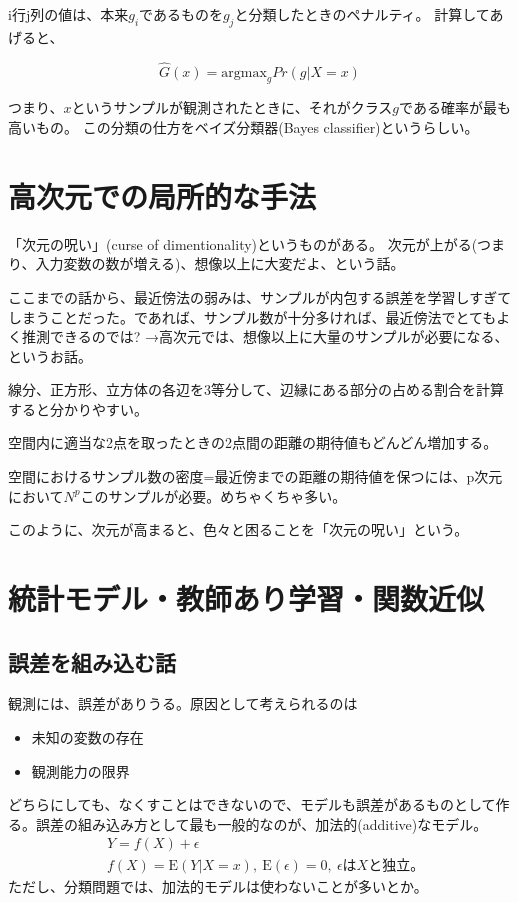 \documentclass[uplatex]{jsarticle}
\begin{document}
i行j列の値は、本来$g_i$であるものを$g_j$と分類したときのペナルティ。
計算してあげると、

\[
  \hat{G}(x) = \mathrm{argmax}_g Pr(g|X=x)
\]

つまり、$x$というサンプルが観測されたときに、それがクラス$g$である確率が最も高いもの。
この分類の仕方をベイズ分類器(Bayes classifier)というらしい。

\section{高次元での局所的な手法}
「次元の呪い」(curse of dimentionality)というものがある。
次元が上がる(つまり、入力変数の数が増える)、想像以上に大変だよ、という話。

ここまでの話から、最近傍法の弱みは、サンプルが内包する誤差を学習しすぎてしまうことだった。であれば、サンプル数が十分多ければ、最近傍法でとてもよく推測できるのでは?
→高次元では、想像以上に大量のサンプルが必要になる、というお話。

線分、正方形、立方体の各辺を3等分して、辺縁にある部分の占める割合を計算すると分かりやすい。

空間内に適当な2点を取ったときの2点間の距離の期待値もどんどん増加する。

空間におけるサンプル数の密度=最近傍までの距離の期待値を保つには、p次元において$N^p$このサンプルが必要。めちゃくちゃ多い。

このように、次元が高まると、色々と困ることを「次元の呪い」という。

\section{統計モデル・教師あり学習・関数近似}
\subsection{誤差を組み込む話}
観測には、誤差がありうる。原因として考えられるのは
\begin{itemize}
  \item 未知の変数の存在
  \item 観測能力の限界
\end{itemize}
どちらにしても、なくすことはできないので、モデルも誤差があるものとして作る。誤差の組み込み方として最も一般的なのが、加法的(additive)なモデル。
\begin{eqnarray*}
  &Y=f(X)+\epsilon \\
  &f(X)=\mathrm{E}(Y|X=x), \ \mathrm{E}(\epsilon)=0, \ \epsilon \mbox{は} X \mbox{と独立。}
\end{eqnarray*}
ただし、分類問題では、加法的モデルは使わないことが多いとか。
\end{document}
